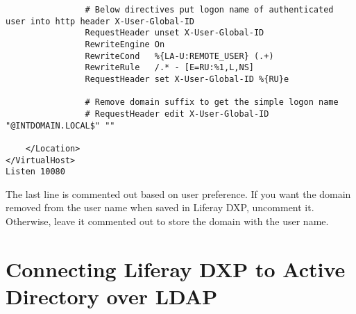 \begin{enumerate}
\begin{verbatim}
                # Below directives put logon name of authenticated user into http header X-User-Global-ID
                RequestHeader unset X-User-Global-ID
                RewriteEngine On
                RewriteCond   %{LA-U:REMOTE_USER} (.+)
                RewriteRule   /.* - [E=RU:%1,L,NS]
                RequestHeader set X-User-Global-ID %{RU}e

                # Remove domain suffix to get the simple logon name
                # RequestHeader edit X-User-Global-ID "@INTDOMAIN.LOCAL$" ""

    </Location>
</VirtualHost>
Listen 10080
\end{verbatim}

  The last line is commented out based on user preference. If you want
  the domain removed from the user name when saved in Liferay DXP,
  uncomment it. Otherwise, leave it commented out to store the domain
  with the user name.
\end{enumerate}

\section{Connecting Liferay DXP to Active Directory over
LDAP}\label{connecting-liferay-dxp-to-active-directory-over-ldap}

